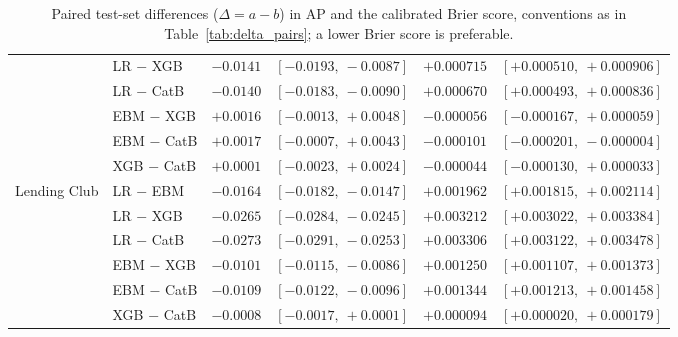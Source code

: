 \begin{table}[!t]
\begin{tabular}{@{}llrcrc@{}}
                 & LR $-$ XGB   & $-0.0141$ & $[-0.0193,\ -0.0087]$ & $+0.000715$ & $[+0.000510,\ +0.000906]$ \\
                 & LR $-$ CatB  & $-0.0140$ & $[-0.0183,\ -0.0090]$ & $+0.000670$ & $[+0.000493,\ +0.000836]$ \\
                 & EBM $-$ XGB  & $+0.0016$ & $[-0.0013,\ +0.0048]$ & $-0.000056$ & $[-0.000167,\ +0.000059]$ \\
                 & EBM $-$ CatB & $+0.0017$ & $[-0.0007,\ +0.0043]$ & $-0.000101$ & $[-0.000201,\ -0.000004]$ \\
                 & XGB $-$ CatB & $+0.0001$ & $[-0.0023,\ +0.0024]$ & $-0.000044$ & $[-0.000130,\ +0.000033]$ \\
\midrule
Lending Club     & LR $-$ EBM   & $-0.0164$ & $[-0.0182,\ -0.0147]$ & $+0.001962$ & $[+0.001815,\ +0.002114]$ \\
                 & LR $-$ XGB   & $-0.0265$ & $[-0.0284,\ -0.0245]$ & $+0.003212$ & $[+0.003022,\ +0.003384]$ \\
                 & LR $-$ CatB  & $-0.0273$ & $[-0.0291,\ -0.0253]$ & $+0.003306$ & $[+0.003122,\ +0.003478]$ \\
                 & EBM $-$ XGB  & $-0.0101$ & $[-0.0115,\ -0.0086]$ & $+0.001250$ & $[+0.001107,\ +0.001373]$ \\
                 & EBM $-$ CatB & $-0.0109$ & $[-0.0122,\ -0.0096]$ & $+0.001344$ & $[+0.001213,\ +0.001458]$ \\
                 & XGB $-$ CatB & $-0.0008$ & $[-0.0017,\ +0.0001]$ & $+0.000094$ & $[+0.000020,\ +0.000179]$ \\
\bottomrule
\end{tabular}
\caption[Paired differences in AP and Brier score]{Paired test-set differences
  ($\Delta=a-b$) in AP and the calibrated Brier score, conventions as in
  Table~\ref{tab:delta_pairs}; a lower Brier score is preferable.}
\label{tab:delta_pairs_ap_brier}
\end{table}

